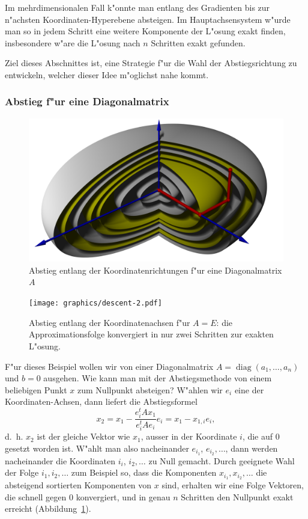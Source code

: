 Im mehrdimensionalen Fall k"onnte man entlang des Gradienten bis zur
n"achsten Koordinaten-Hyperebene absteigen.
Im Hauptachsensystem w"urde man so in jedem Schritt eine weitere Komponente
der L"osung exakt finden, insbesondere w"are die L"osung nach $n$
Schritten exakt gefunden.

Ziel dieses Abschnittes ist, eine Strategie f"ur die Wahl der 
Abstiegsrichtung zu entwickeln, welcher dieser Idee m"oglichst nahe kommt.

\subsubsection{Abstieg f"ur eine Diagonalmatrix}
\begin{figure}
\includegraphics[width=\hsize]{graphics/descent3d.jpg}
\caption{Abstieg entlang der Koordinatenrichtungen f"ur eine Diagonalmatrix
$A$
\label{descent3d}}
\end{figure}
\begin{figure}
\begin{center}
\texttt{[image: graphics/descent-2.pdf]}
\end{center}
\caption{Abstieg entlang der Koordinatenachsen f"ur $A=E$:
die Approximationsfolge konvergiert in nur zwei Schritten zur exakten
L"osung.
\label{descent:exact}}
\end{figure}
F"ur dieses Beispiel wollen wir von einer Diagonalmatrix
$A=\operatorname{diag}(a_1,\dots,a_n)$ und $b=0$ ausgehen.
Wie kann man mit der Abstiegsmethode von einem beliebigen Punkt $x$
zum Nullpunkt absteigen?
W"ahlen wir $e_i$ eine der Koordinaten-Achsen, dann liefert die
Abstiegsformel
\[
x_2=x_1-\frac{e_i^tAx_1}{e_i^tAe_i}e_i
=x_1-x_{1,i}e_i,
\]
d.~h. $x_2$ ist der gleiche Vektor wie $x_1$, ausser in der Koordinate $i$,
die auf $0$ gesetzt worden ist.
W"ahlt man also nacheinander $e_{i_1}$, $e_{i_2},\dots$, dann werden
nacheinander die Koordinaten $i_i$, $i_2,\dots$ zu Null gemacht.
Durch geeignete Wahl der Folge $i_1,i_2,\dots$ zum Beispiel so,
dass die Komponenten $x_{i_1},x_{i_2},\dots$ die absteigend sortierten
Komponenten von $x$ sind, erhalten wir eine Folge Vektoren, die schnell
gegen $0$ konvergiert, und in genau $n$ Schritten den Nullpunkt exakt
erreicht (Abbildung~\ref{descent3d}).

